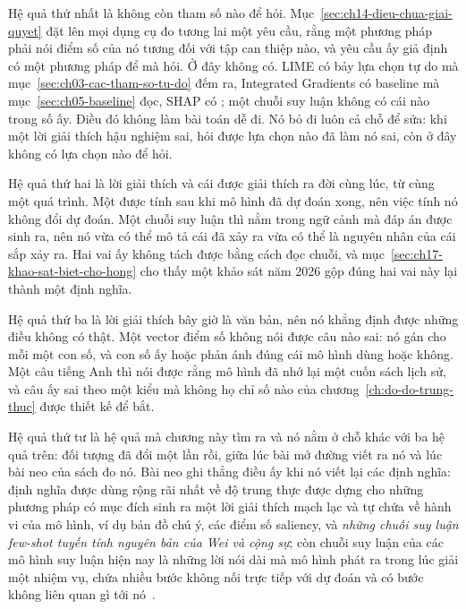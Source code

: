 %
Hệ quả thứ nhất là không còn tham số nào để hỏi.
Mục~\ref{sec:ch14-dieu-chua-giai-quyet} đặt lên mọi dụng cụ đo tương lai một yêu
cầu, rằng một phương pháp phải nói điểm số của nó tương đối với tập can thiệp
nào, và yêu cầu ấy giả định có một phương pháp để mà hỏi. Ở đây không có. LIME có
bảy lựa chọn tự do mà mục~\ref{sec:ch03-cac-tham-so-tu-do} đếm ra, Integrated
Gradients có baseline mà mục~\ref{sec:ch05-baseline} đọc, SHAP có
;
một chuỗi suy luận không có cái nào trong số ấy. Điều đó không làm bài toán dễ
đi. Nó bỏ đi luôn cả chỗ để sửa: khi một lời giải thích hậu nghiệm sai, hỏi được
lựa chọn nào đã làm nó sai, còn ở đây không có lựa chọn nào để hỏi.

Hệ quả thứ hai là lời giải thích và cái được giải thích ra đời cùng lúc, từ cùng
một quá trình. Một  được tính sau khi mô hình đã dự
đoán xong, nên
việc tính nó không đổi dự đoán. Một chuỗi suy luận thì nằm trong ngữ cảnh mà đáp
án được sinh ra, nên nó vừa có thể mô tả cái đã xảy ra vừa có thể là nguyên nhân
của cái sắp xảy ra. Hai vai ấy không tách được bằng cách đọc chuỗi, và
mục~\ref{sec:ch17-khao-sat-biet-cho-hong} cho thấy một khảo sát năm 2026 gộp
đúng hai vai này lại thành một định nghĩa.

Hệ quả thứ ba là lời giải thích bây giờ là văn bản, nên nó khẳng định được những
điều không có thật. Một vector điểm số không nói được câu nào sai: nó gán cho mỗi
 một con số, và con số ấy hoặc phản ánh đúng cái mô hình
dùng hoặc không. Một câu tiếng Anh thì nói được rằng mô hình đã nhớ lại một cuốn sách lịch
sử, và câu ấy sai theo một kiểu mà không họ chỉ số nào của
chương~\ref{ch:do-do-trung-thuc} được thiết kế để bắt.

%
Hệ quả thứ tư là hệ quả mà chương này tìm ra và nó nằm ở chỗ khác với ba hệ quả
trên: đối tượng đã đổi một lần rồi, giữa lúc bài mở đường viết ra nó và lúc bài
neo của sách đo nó. Bài neo ghi thẳng điều ấy khi nó viết lại các định nghĩa:
định nghĩa được dùng rộng rãi nhất về độ trung thực được dựng cho những phương
pháp có mục đích sinh ra một lời giải thích mạch lạc và tự chứa về hành vi của
mô hình, ví dụ bản đồ chú ý, các điểm số saliency, và \emph{những chuỗi suy luận
few-shot tuyến tính nguyên bản của Wei và cộng sự}; còn chuỗi suy luận của các mô
hình suy luận hiện nay là những lời nói dài mà mô hình phát ra trong lúc giải một
nhiệm vụ, chứa nhiều bước không nối trực tiếp với dự đoán và có bước không liên
quan gì tới nó~\autocite{p21metrics}.

